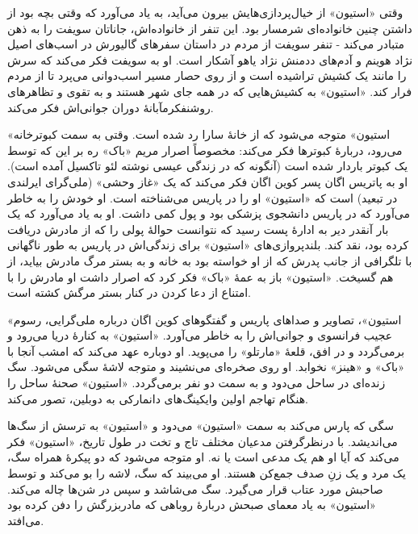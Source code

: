 \documentclass[12pt]{book}
\newcommand{\noun}[1]{«{#1}»}
\begin{document}
    وقتی \noun{استیون} از خیال‌پردازی‌هایش بیرون می‌آید، به یاد می‌آورد که وقتی بچه بود از داشتن چنین خانواده‌ای شرمسار بود. این تنفر از خانواده‌اش، جاناتان سویفت را به ذهن متبادر می‌کند - تنفر سویفت از مردم در داستان سفرهای گالیورش در اسب‌های اصیل نژاد هوینم و آدم‌های ددمنش نژاد یاهو آشکار است. او به سویفت فکر می‌کند که سرش را مانند یک کشیش تراشیده است و از روی حصار مسیر اسب‌دوانی می‌پرد تا از مردم فرار کند. \noun{استیون} به کشیش‌هایی که در همه جای شهر هستند و به تقوی و تظاهرهای روشنفکرمآبانۀ دوران جوانی‌اش فکر می‌کند.

    \noun{استیون} متوجه می‌شود که از خانۀ سارا رد شده است. وقتی به سمت کبوترخانه می‌رود، دربارۀ کبوترها فکر می‌کند: مخصوصاً اصرار مریم \noun{باک} ره بر این که توسط یک کبوتر باردار شده است (آنگونه که در زندگی عیسی نوشته لئو تاکسیل آمده است). او به پاتریس اگان پسر کوین اگان فکر می‌کند که یک «غاز وحشی» (ملی‌گرای ایرلندی در تبعید) است که \noun{استیون} او را در پاریس می‌شناخته است. او خودش را به خاطر می‌آورد که در پاریس دانشجوی پزشکی بود و پول کمی داشت. او به یاد می‌آورد که یک بار آنقدر دیر به ادارۀ پست رسید که نتوانست حوالۀ پولی را که از مادرش دریافت کرده بود، نقد کند. بلندپروازی‌های \noun{استیون} برای زندگی‌اش در پاریس به طور ناگهانی با تلگرافی از جانب پدرش که از او خواسته بود به خانه و به بستر مرگ مادرش بیاید، از هم گسیخت. \noun{استیون} باز به عمۀ \noun{باک}  فکر کرد که اصرار داشت او مادرش را با امتناع از دعا کردن در کنار بستر مرگش کشته است.

    \noun{استیون}، تصاویر و صداهای پاریس و گفتگوهای کوین اگان درباره ملی‌گرایی، رسوم عجیب فرانسوی و جوانی‌اش را به خاطر می‌آورد. \noun{استیون} به کنارۀ دریا می‌رود و برمی‌گردد و در افق، قلعۀ \noun{مارتلو} را می‌پوید. او دوباره عهد می‌کند که امشب آنجا با \noun{باک}  و \noun{هینز}  نخوابد. او روی صخره‌ای می‌نشیند و متوجه لاشۀ سگی می‌شود. سگ زنده‌ای در ساحل می‌دود و به سمت دو نفر برمی‌گردد. \noun{استیون} صحنۀ ساحل را هنگام تهاجم اولین وایکینگ‌های دانمارکی به دوبلین، تصور می‌کند.

    سگی که پارس می‌کند به سمت \noun{استیون} می‌دود و \noun{استیون} به ترسش از سگ‌ها می‌اندیشد. با درنظرگرفتن مدعیان مختلف تاج و تخت در طول تاریخ، \noun{استیون} فکر می‌کند که آیا او هم یک مدعی است یا نه. او متوجه می‌شود که دو پیکرۀ همراه سگ، یک مرد و یک زنِ صدف جمع‌کن هستند. او می‌بیند که سگ، لاشه را بو می‌کند و توسط صاحبش مورد عتاب قرار می‌گیرد. سگ می‌شاشد و سپس در شن‌ها چاله می‌کند. \noun{استیون} به یاد معمای صبحش دربارۀ روباهی که مادربزرگش را دفن کرده بود می‌افتد.
\end{document}
